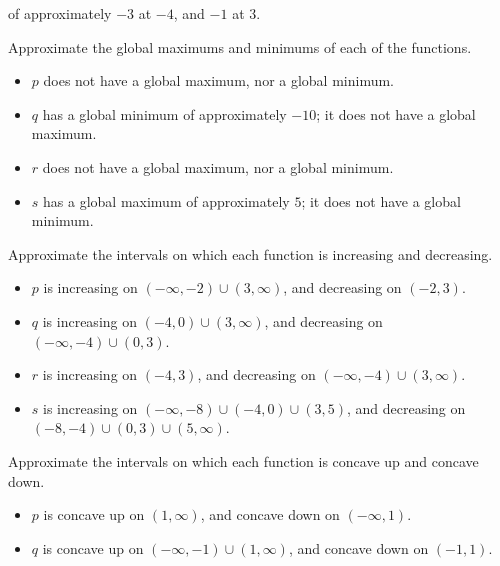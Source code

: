 \begin{exercises}
\begin{problem}
\begin{subproblem}
\begin{shortsolution}
\begin{itemize}
				       of approximately $-3$ at $-4$, and $-1$ at $3$.
			 \end{itemize}
		 \end{shortsolution}
	 \end{subproblem}
	 \begin{subproblem}
		 Approximate the global maximums and minimums of each of the functions.
		 \begin{shortsolution}
			 \begin{itemize}
				 \item $p$ does not have a global maximum, nor a global minimum.
				 \item $q$ has a global minimum of approximately $-10$; it does not have a global maximum.
				 \item $r$ does not have a global maximum, nor a global minimum.
				 \item $s$ has a global maximum of approximately $5$; it does not have a global minimum.
			 \end{itemize}
		 \end{shortsolution}
	 \end{subproblem}
	 \begin{subproblem}
		 Approximate the intervals on which each function is increasing and decreasing.
		 \begin{shortsolution}
			 \begin{itemize}
				 \item $p$ is increasing on $(-\infty,-2)\cup (3,\infty)$, and decreasing on $(-2,3)$.
				 \item $q$ is increasing on $(-4,0)\cup (3,\infty)$, and decreasing on $(-\infty,-4)\cup (0,3)$.
				 \item $r$ is increasing on $(-4,3)$, and decreasing on $(-\infty,-4)\cup (3,\infty)$.
				 \item $s$ is increasing on $(-\infty,-8)\cup (-4,0)\cup (3,5)$, and decreasing on $(-8,-4)\cup (0,3)\cup (5,\infty)$.
			 \end{itemize}
		 \end{shortsolution}
	 \end{subproblem}
	 \begin{subproblem}
		 Approximate the intervals on which each function is concave up and concave down.
		 \begin{shortsolution}
			 \begin{itemize}
				 \item $p$ is concave up on  $(1,\infty)$, and concave down on  $(-\infty,1)$.
				 \item $q$ is concave up on $(-\infty,-1)\cup (1,\infty)$, and concave down on $(-1,1)$.

\end{itemize}
\end{shortsolution}
\end{subproblem}
\end{problem}
\end{exercises}
